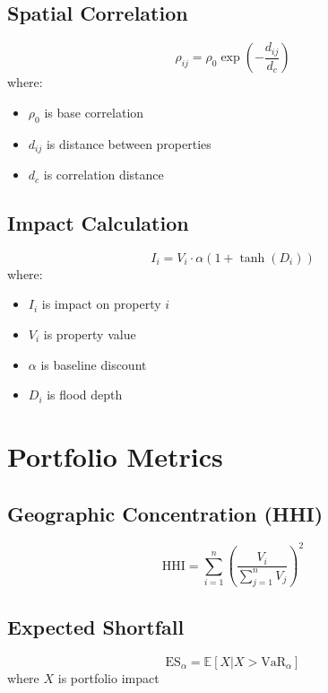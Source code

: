 \documentclass{article}
\begin{document}
\subsection{Spatial Correlation}
\[
\rho_{ij} = \rho_0 \exp\left(-\frac{d_{ij}}{d_c}\right)
\]
where:
\begin{itemize}
    \item $\rho_0$ is base correlation
    \item $d_{ij}$ is distance between properties
    \item $d_c$ is correlation distance
\end{itemize}

\subsection{Impact Calculation}
\[
I_i = V_i \cdot \alpha(1 + \tanh(D_i))
\]
where:
\begin{itemize}
    \item $I_i$ is impact on property $i$
    \item $V_i$ is property value
    \item $\alpha$ is baseline discount
    \item $D_i$ is flood depth
\end{itemize}

\section{Portfolio Metrics}

\subsection{Geographic Concentration (HHI)}
\[
\text{HHI} = \sum_{i=1}^{n} \left(\frac{V_i}{\sum_{j=1}^{n} V_j}\right)^2
\]

\subsection{Expected Shortfall}
\[
\text{ES}_{\alpha} = \mathbb{E}[X|X > \text{VaR}_{\alpha}]
\]
where $X$ is portfolio impact
\end{document}
